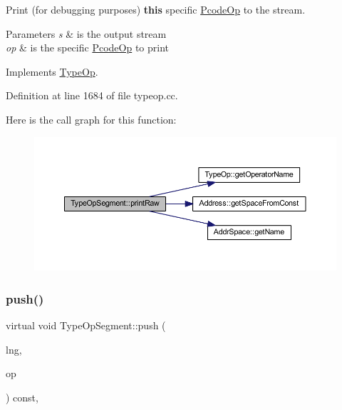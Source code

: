 Print (for debugging purposes) {\bfseries{this}} specific \mbox{\hyperlink{class_pcode_op}{Pcode\+Op}} to the stream. 


\begin{DoxyParams}{Parameters}
{\em s} & is the output stream \\
\hline
{\em op} & is the specific \mbox{\hyperlink{class_pcode_op}{Pcode\+Op}} to print \\
\hline
\end{DoxyParams}


Implements \mbox{\hyperlink{class_type_op_a60717e486917a30cc7cb6e3ce02585e1}{Type\+Op}}.



Definition at line 1684 of file typeop.\+cc.

Here is the call graph for this function\+:
\nopagebreak
\begin{figure}[H]
\begin{center}
\leavevmode
\includegraphics[width=350pt]{class_type_op_segment_aa0faf7a0a8f5094b7b851bcefca5051f_cgraph}
\end{center}
\end{figure}
\mbox{\label{class_type_op_segment_a2379c6e24cf03a2cef6c297a5d9f4c92}} 
\subsubsection{\texorpdfstring{push()}{push()}}
{\footnotesize\ttfamily virtual void Type\+Op\+Segment\+::push (\begin{DoxyParamCaption}\item[{\mbox{\hyperlink{class_print_language}{Print\+Language}} $\ast$}]{lng,  }\item[{const \mbox{\hyperlink{class_pcode_op}{Pcode\+Op}} $\ast$}]{op }\end{DoxyParamCaption}) const\hspace{0.3cm}{\ttfamily [inline]}, {\ttfamily [virtual]}}



